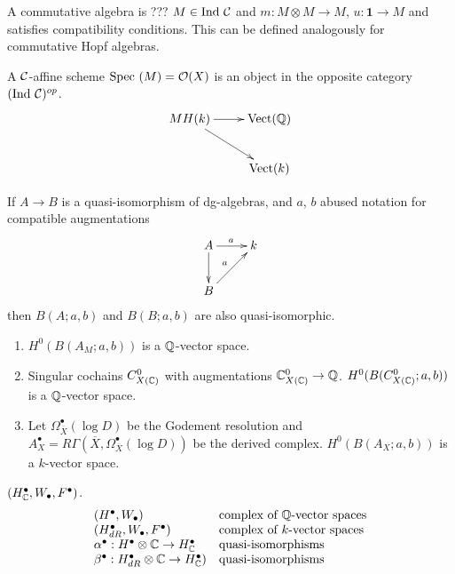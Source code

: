\begin{enumerate}
\begin{defn}
A commutative algebra is ???
$M \in \mathrm{Ind~} \mathcal{C}$ and $m : M \otimes M \to M$, $u : \mathbf{1} \to M$ and satisfies compatibility conditions.
This can be defined analogously for commutative Hopf algebras.
\end{defn}
\begin{defn}
A $\mathcal{C}$-affine scheme $\mathrm{Spec}~(M) = \mathcal{O}(X)$ is an object in the opposite category $(\mathrm{Ind~} \mathcal{C})^{op}$.
\[
\xymatrix{
MH(k) \ar[r] \ar[dr] & \mathrm{Vect}(\Q) \\
& \mathrm{Vect}(k)
}
\]
\end{defn}
\TODO
\end{enumerate}

\begin{prop}
If $A \to B$ is a quasi-isomorphism of dg-algebras, and $a$, $b$ abused notation for compatible augmentations
\[
\xymatrix{
A \ar[d] \ar[r]^a & k \\
B \ar[ur]^a & 
}
\]
then $B(A; a, b)$ and $B(B; a, b)$ are also quasi-isomorphic.
\end{prop}

\begin{enumerate}
\item $H^0(B(A_M;a,b))$ is a $\mathbb{Q}$-vector space.
\item Singular cochains $C^0_{X(\mathbb{C})}$ with augmentations $\mathbb{C}^0_{X(\mathbb{C})} \to \mathbb{Q}$. $H^0(B(C^0_{X(\mathbb{C})};a,b))$ is a $\mathbb{Q}$-vector space. 
\item Let $\Omega_{\overline{X}}^{\bullet}(\log D)$ be the Godement resolution and $A_X^{\bullet} = R\Gamma(\overline{X}, \Omega^{\bullet}_{\overline{X}}(\log D))$ be the derived complex. $H^0(B(A_X; a, b))$ is a $k$-vector space.
\end{enumerate}

\begin{defn}
$(H_{\mathbb{C}}^{\bullet}, W_{\bullet}, F^{\bullet})$. 
\[
\begin{array}{ll}
(H^{\bullet}, W_{\bullet}) & \textrm{complex of $\mathbb{Q}$-vector spaces} \\
(H^{\bullet}_{dR}, W_{\bullet}, F^{\bullet}) & \textrm{complex of $k$-vector spaces} \\
\alpha^{\bullet} : H^{\bullet} \otimes \mathbb{C} \to H^{\bullet}_{\mathbb{C}}&  \textrm{quasi-isomorphisms} \\
\beta^{\bullet} : H_{dR}^{\bullet} \otimes \mathbb{C} \to H^{\bullet}_{\mathbb{C}}) & \textrm{quasi-isomorphisms}
\end{array}
\]
\end{defn}


